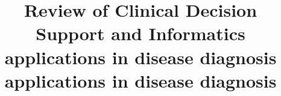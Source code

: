 \documentclass[conference]{IEEEtran}
\begin{document}
%
\title{Review of Clinical Decision Support and Informatics applications in disease diagnosis applications in disease diagnosis}


\author{
}


% 








\maketitle
\end{document}
